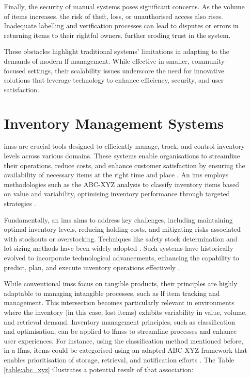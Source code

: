 Finally, the security of manual systems poses significant concerns. As the volume of items increases, the risk of theft, loss, or unauthorised access also rises. Inadequate labelling and verification processes can lead to disputes or errors in returning items to their rightful owners, further eroding trust in the system.

These obstacles highlight traditional systems' limitations in adapting to the demands of modern \ac{lf} management. While effective in smaller, community-focused settings, their scalability issues underscore the need for innovative solutions that leverage technology to enhance efficiency, security, and user satisfaction.


\section{Inventory Management Systems} \label{sec:ims}

\acp{ims} are crucial tools designed to efficiently manage, track, and control inventory levels across various domains. These systems enable organisations to streamline their operations, reduce costs, and enhance customer satisfaction by ensuring the availability of necessary items at the right time and place \cite{Pauliina2024}. An \ac{ims} employs methodologies such as the ABC-XYZ analysis to classify inventory items based on value and variability, optimising inventory performance through targeted strategies \cite{Pauliina2024}.

Fundamentally, an \ac{ims} aims to address key challenges, including maintaining optimal inventory levels, reducing holding costs, and mitigating risks associated with stockouts or overstocking. Techniques like safety stock determination and lot-sizing methods have been widely adopted \cite{Prabakaran2023}. Such systems have historically evolved to incorporate technological advancements, enhancing the capability to predict, plan, and execute inventory operations effectively \cite{Chebet2019}.

While conventional \acp{ims} focus on tangible products, their principles are highly adaptable to managing intangible processes, such as \ac{lf} item tracking and management. This intersection becomes particularly relevant in environments where the inventory (in this case, lost items) exhibits variability in value, volume, and retrieval demand. Inventory management principles, such as classification and optimisation, can be applied to \acp{lfms} to streamline processes and enhance user experiences. For instance, using the classification method mentioned before, in a \ac{lfms}, items could be categorised using an adapted ABC-XYZ framework that enables prioritisation of storage, retrieval, and notification efforts \cite{Khobragade2018}. The Table \ref{table:abc_xyz} illustrates a potential result of that association:

